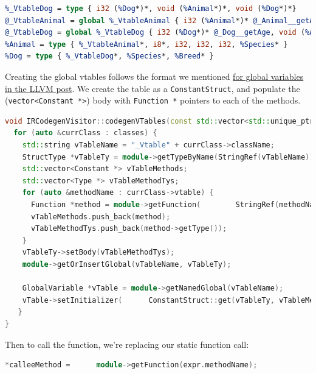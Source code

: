 \begin{lstlisting}[language=llvm,caption={vtable.ll}]
%_VtableAnimal = type { i32 (%Animal*)*, void (%Animal*)* }
%_VtableDog = type { i32 (%Dog*)*, void (%Animal*)*, void (%Dog*)*}
@_VtableAnimal = global %_VtableAnimal { i32 (%Animal*)* @_Animal__getAge, void (%Animal*)* @_Animal__printSpecies }
@_VtableDog = global %_VtableDog { i32 (%Dog*)* @_Dog__getAge, void (%Animal*)* @_Animal__printSpecies, void (%Dog*)* @_Dog__printBreed }
%Animal = type { %_VtableAnimal*, i8*, i32, i32, i32, %Species* }
%Dog = type { %_VtableDog*, %Species*, %Breed* }
\end{lstlisting}

Creating the global vtables follows the format we mentioned
\href{https://mukulrathi.com/create-your-own-programming-language/llvm-ir-cpp-api-tutorial/\#global-variables}{for
global variables in the LLVM post}. We create the table as a
\texttt{ConstantStruct}, and populate the
(\texttt{vector\textless{}Constant\ *\textgreater{}}) body with
\texttt{Function\ *} pointers to each of the methods.

%

\begin{lstlisting}[language=C++,caption={class\_codegen.cc}]
void IRCodegenVisitor::codegenVTables(const std::vector<std::unique_ptr<ClassIR>> &classes) {
  for (auto &currClass : classes) {
    std::string vTableName = "_Vtable" + currClass->className;
    StructType *vTableTy = module->getTypeByName(StringRef(vTableName));
    std::vector<Constant *> vTableMethods;
    std::vector<Type *> vTableMethodTys;
    for (auto &methodName : currClass->vtable) {
      Function *method = module->getFunction(        StringRef(methodName));
      vTableMethods.push_back(method);
      vTableMethodTys.push_back(method->getType());
    }
    vTableTy->setBody(vTableMethodTys);
    module->getOrInsertGlobal(vTableName, vTableTy);

    GlobalVariable *vTable = module->getNamedGlobal(vTableName);
    vTable->setInitializer(      ConstantStruct::get(vTableTy, vTableMethods));  
   }
}
\end{lstlisting}

Then to call the function, we're replacing our static function call:


\begin{lstlisting}[language=C++]
*calleeMethod =      module->getFunction(expr.methodName);
\end{lstlisting}

